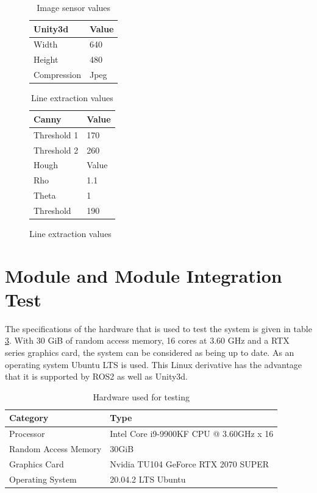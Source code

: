 \begin{figure}[!htb]
	\begin{minipage}[t]{0.48\textwidth}	
		\begin{table}[H]	
			\centering
			\caption{Image sensor values}
			\begin{tabular}{l l } 
				\midrule\midrule
				Unity3d  & Value\\ 
				\midrule
				Width & 640 \\
				Height & 480 \\
				Compression & Jpeg\\
				
			\end{tabular}
			\label{tab_imagesens}
		\end{table}
	\end{minipage}\hfill
	\begin{minipage}[t]{0.48\textwidth}
		\begin{table}[H]
			\centering
			\caption{Line extraction values}
			\begin{tabular}{l l } 
				\midrule\midrule 
				Canny  & Value\\ 
				\midrule
				Threshold 1 &170 \\	
				Threshold 2 & 260 \\
				\midrule\midrule 
				Hough  & Value\\ 
				\midrule
				Rho & 1.1 \\	
				Theta & 1\degree\\
				Threshold & 190
			\end{tabular}
			\label{tab_extraction}
		\end{table}
	\end{minipage}
\end{figure}



	\section{Module and Module Integration Test}\label{latency}
	The specifications of the hardware that is used to test the system is given in table \ref{tab_hardware}. With 30 GiB of random access memory, 16 cores at 3.60 GHz and a RTX series graphics card, the system can be considered as being up to date. As an operating system Ubuntu LTS is used. This Linux derivative has the advantage that it is supported by \ac{ROS2} as well as Unity3d.	
	
	\begin{table}[H]
		\centering	
		\caption{Hardware used for testing}
		\begin{tabular}{l l } 
			\toprule
			Category  & Type\\ 
			\midrule
			Processor & 			Intel Core i9-9900KF CPU @ 3.60GHz x 16 \\ 
			Random Access Memory & 	30GiB\\
			Graphics Card & 		Nvidia TU104 GeForce RTX 2070 SUPER\\
			Operating System & 		20.04.2 LTS Ubuntu\\
			\bottomrule	
		\end{tabular}
		\label{tab_hardware}
	\end{table}

